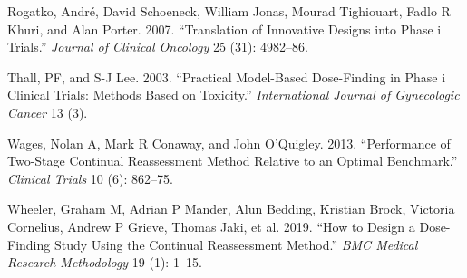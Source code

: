 \documentclass[
]{article}
\newlength{\cslhangindent}
\newlength{\cslentryspacingunit} %
\newenvironment{CSLReferences}[2] %
 {%
  \setlength{\parindent}{0pt}
  \ifodd #1
  \let\oldpar\par
  \def\par{\hangindent=\cslhangindent\oldpar}
  \fi
  \setlength{\parskip}{#2\cslentryspacingunit}
 }%
 {}
\begin{document}
\begin{CSLReferences}{1}{0}
\leavevmode{}%
Rogatko, André, David Schoeneck, William Jonas, Mourad Tighiouart, Fadlo
R Khuri, and Alan Porter. 2007. {``Translation of Innovative Designs
into Phase i Trials.''} \emph{Journal of Clinical Oncology} 25 (31):
4982--86.

\leavevmode{}%
Thall, PF, and S-J Lee. 2003. {``Practical Model-Based Dose-Finding in
Phase i Clinical Trials: Methods Based on Toxicity.''}
\emph{International Journal of Gynecologic Cancer} 13 (3).

\leavevmode{}%
Wages, Nolan A, Mark R Conaway, and John O'Quigley. 2013. {``Performance
of Two-Stage Continual Reassessment Method Relative to an Optimal
Benchmark.''} \emph{Clinical Trials} 10 (6): 862--75.

\leavevmode{}%
Wheeler, Graham M, Adrian P Mander, Alun Bedding, Kristian Brock,
Victoria Cornelius, Andrew P Grieve, Thomas Jaki, et al. 2019. {``How to
Design a Dose-Finding Study Using the Continual Reassessment Method.''}
\emph{BMC Medical Research Methodology} 19 (1): 1--15.

\end{CSLReferences}
\end{document}

